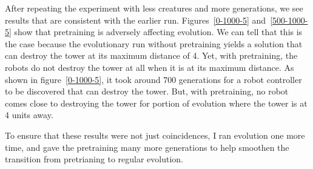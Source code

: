 \documentclass[12pt, a4paper]{article}
\begin{document}
After repeating the experiment with less creatures and more generations, we see results that are consistent with the earlier run. Figures~\ref{0-1000-5} and~\ref{500-1000-5} show that pretraining is adversely affecting evolution. We can tell that this is the case because the evolutionary run without pretraining yields a solution that can destroy the tower at its maximum distance of 4. Yet, with pretraining, the robots do not destroy the tower at all when it is at its maximum distance. As shown in figure~\ref{0-1000-5}, it took around 700 generations for a robot controller to be discovered that can destroy the tower. But, with pretraining, no robot comes close to destroying the tower for portion of evolution where the tower is at 4 units away.

To ensure that these results were not just coincidences, I ran evolution one more time, and gave the pretraining many more generations to help smoothen the transition from pretrianing to regular evolution.
\end{document}
